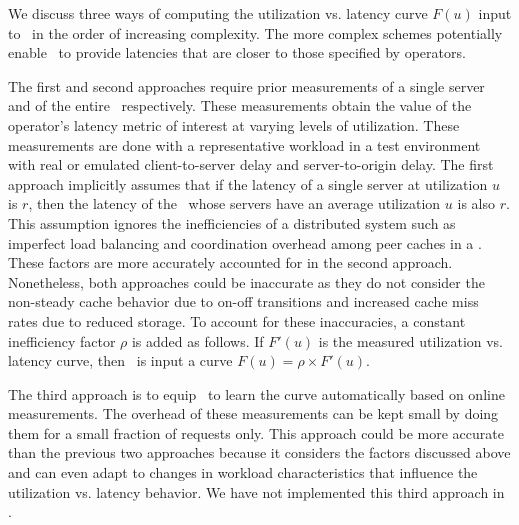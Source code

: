 We discuss three ways of computing the utilization vs. latency curve $F(u)$ input to \shrink\ in the order of increasing complexity. The more complex schemes potentially enable \shrink\ to provide latencies that are closer to those specified by operators. 

The first and second approaches require prior measurements of a single server and of the entire \cdc\ respectively.
These measurements obtain the  value of the operator's latency metric of interest at varying levels of utilization.  These measurements are done with a representative workload in a test environment with real or emulated client-to-server delay and server-to-origin delay.  The first approach implicitly assumes that if the latency of a single server at utilization $u$ is $r$, then the latency of the \cdc\ whose servers have an average utilization $u$ is also $r$. This assumption ignores the inefficiencies of a distributed system such as imperfect load balancing and coordination overhead among peer caches in a \cdc. These factors are more accurately accounted for in the second approach. Nonetheless, both approaches could be inaccurate as they do not consider the non-steady cache behavior due to on-off transitions and increased cache miss rates due to reduced storage.  To account for these inaccuracies, a constant inefficiency factor $\rho$ is added as follows. If $F'(u)$ is the measured  utilization vs. latency curve, then \shrink\ is input a curve $F(u) = \rho \times F'(u)$.

The third approach is to equip \shrink\ to learn the curve automatically based on online measurements. The overhead of these measurements can be kept small by doing them for a small fraction of requests only. This approach could be more accurate than the previous two approaches because it considers the factors discussed above and can even adapt to changes in workload characteristics that influence the utilization vs. latency behavior. We have not implemented this third approach in \shrink. 







